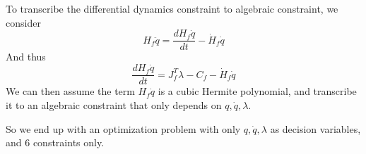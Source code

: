 \documentclass{article}
\begin{document}
To transcribe the differential dynamics constraint to algebraic constraint, we consider
\begin{equation}
H_f\ddot{q}=\frac{dH_f\dot{q}}{dt}-\dot{H}_f\dot{q}
\end{equation}
And thus
\begin{equation}
\frac{dH_f\dot{q}}{dt}=J_f^T\lambda-C_f-\dot{H}_f\dot{q}
\end{equation}
We can then assume the term $H_f\dot{q}$ is a cubic Hermite polynomial, and transcribe it to an algebraic constraint that only depends on $q,\dot{q},\lambda$.

So we end up with an optimization problem with only $q,\dot{q},\lambda$ as decision variables, and 6 constraints only.
\end{document}
